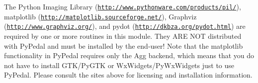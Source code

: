 The Python Imaging Library (\href{http://www.pythonware.com/products/pil/}{\tt http://www.pythonware.com/products/pil/}), matplotlib (\href{http://matplotlib.sourceforge.net/}{\tt http://matplotlib.sourceforge.net/}), Graphviz (\href{http://www.graphviz.org/}{\tt http://www.graphviz.org/}), and pydot (\href{http://dkbza.org/pydot.html}{\tt http://dkbza.org/pydot.html}) are required by one or more routines in this module. They ARE NOT distributed with PyPedal and must be installed by the end-\/user! Note that the matplotlib functionality in PyPedal requires only the Agg backend, which means that you do not have to install GTK/PyGTK or WxWidgets/PyWxWidgets just to use PyPedal. Please consult the sites above for licensing and installation information. 